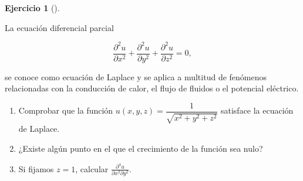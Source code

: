 \documentclass[
  a4paper,
]{scrreport}
\theoremstyle{definition}
\newtheorem{exercise}{Ejercicio}[chapter]
\theoremstyle{remark}
\begin{document}
\begin{exercise}[]\protect\hypertarget{exr-ecuacion-laplace}{}\label{exr-ecuacion-laplace}

La ecuación diferencial parcial

\[
\frac{\partial^2 u}{\partial x^2} + \frac{\partial^2 u}{\partial y^2} + \frac{\partial^2 u}{\partial z^2} = 0,
\]

se conoce como ecuación de Laplace y se aplica a multitud de fenómenos
relacionadas con la conducción de calor, el flujo de fluidos o el
potencial eléctrico.

\begin{enumerate}
\def\labelenumi{\alph{enumi}.}
\item
  Comprobar que la función
  \(u(x,y,z)=\dfrac{1}{\sqrt{x^2 + y^2 + z^2}}\) satisface la ecuación
  de Laplace.
\item
  ¿Existe algún punto en el que el crecimiento de la función sea nulo?
\item
  Si fijamos \(z=1\), calcular
  \(\frac{\partial^4u}{\partial x^2\partial y^2}\).
\end{enumerate}

\end{exercise}
\end{document}
